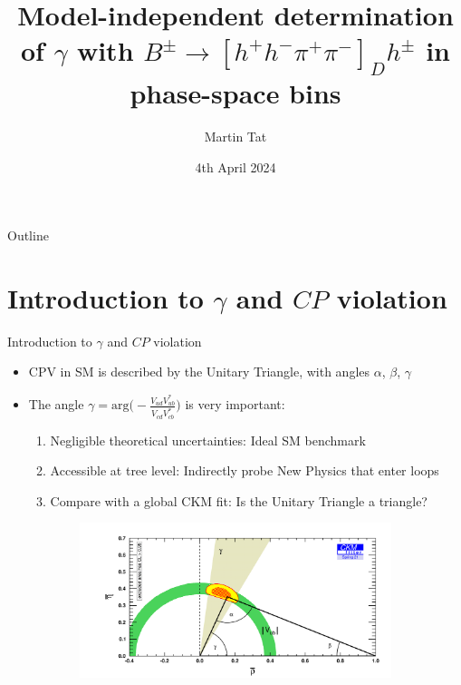 \documentclass[xcolor={dvipsnames}]{beamer}
\title[B2OC]{Model-independent determination of \texorpdfstring{$\gamma$}{gamma} with \texorpdfstring{$B^\pm\to[h^+h^-\pi^+\pi^-]_Dh^\pm$}{B2DhD2hhpipi} in phase-space bins}
\author[Martin Tat]{Martin Tat}
\institute[University of Oxford]{\normalsize University of Oxford\\ \vspace{0.3cm}\normalsize B2OC meeting}
\date{4th April 2024}
\begin{document}
\begin{frame}
  \titlepage
\end{frame}

\begin{frame}{Outline}
  \tableofcontents
\end{frame}

\section{Introduction to \texorpdfstring{$\gamma$}{gamma} and \texorpdfstring{$C\!P$}{CP} violation}
\begin{frame}{Introduction to $\gamma$ and $C\!P$ violation}
  \begin{itemize}
    \setlength\itemsep{0.3em}
    \item{CPV in SM is described by the Unitary Triangle, with angles $\alpha$, $\beta$, $\gamma$}
    \item{The angle $\gamma = \text{arg}\Big(-\frac{V^{\phantom{*}}_{ud}V^*_{ub}}{V^{\phantom{*}}_{cd}V^*_{cb}}\Big)$ is very important:}
    \begin{enumerate}
    \setlength\itemsep{0.2em}
      \item{Negligible theoretical uncertainties: Ideal SM benchmark}
      \item{Accessible at tree level: Indirectly probe New Physics that enter loops}
      \item{Compare with a global CKM fit: Is the Unitary Triangle a triangle?}
    \end{enumerate}
  \end{itemize}
  \vspace{-0.2cm}
  \begin{figure}
    \centering
    \begin{subfigure}{0.5\textwidth}
      \centering
      \includegraphics[width = 1.0\textwidth]{Plots/ckmfitter_tree.png}

\end{subfigure}
\end{figure}
\end{frame}
\end{document}
